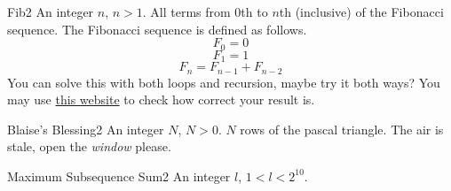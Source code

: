 \begin{task}{Fib}{2}
\In
An integer $n$, $n > 1$.
\Out
All terms from 0th to $n$th (inclusive) of the Fibonacci sequence.
The Fibonacci sequence is defined as follows.
$$F_0 = 0$$
$$F_1 = 1$$
$$F_n = F_{n - 1} + F_{n - 2}$$
\Note
You can solve this with both loops and recursion, maybe try it both ways?
You may use \href{https://oeis.org/}{this website} to check how correct your result is.
\begin{ExampleIO}
\end{ExampleIO}
\end{task}

\begin{task}{Blaise's Blessing}{2}
\In
An integer $N$, $N > 0$.
\Out
$N$ rows of the pascal triangle.
\Hint
The air is stale, open the \textit{window} please.

\begin{ExampleIO}
\end{ExampleIO}
\end{task}

\begin{task}{Maximum Subsequence Sum}{2}
\In
An integer $l$, $1 < l < 2^10$.
\Out
\Hint

\begin{ExampleIO}
\end{ExampleIO}
\end{task}
    
